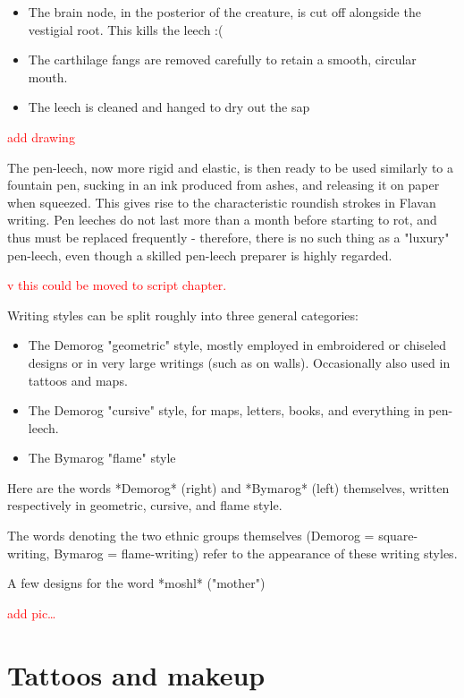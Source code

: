 \documentclass[10pt,oneside]{memoir}
\newcommand{\cmmnt}[1]{\textcolor{red}{#1}}
\begin{document}
\begin{itemize}
\item The brain node, in the posterior of the creature, is cut off alongside the vestigial root. This kills the leech :(
\item The carthilage fangs are removed carefully to retain a smooth, circular mouth.
\item The leech is cleaned and hanged to dry out the sap
\end{itemize}

\cmmnt{add drawing}

The pen-leech, now more rigid and elastic, is then ready to be used similarly to a fountain pen, sucking in an ink produced from ashes, and releasing it on paper when squeezed. This gives rise to the characteristic roundish strokes in Flavan writing. Pen leeches do not last more than a month before starting to rot, and thus must be replaced frequently - therefore, there is no such thing as a "luxury" pen-leech, even though a skilled pen-leech preparer is highly regarded.

\cmmnt{v this could be moved to script chapter.}

Writing styles can be split roughly into three general categories:

\begin{itemize}
\item The Demorog "geometric" style, mostly employed in embroidered or chiseled designs or in very large writings (such as on walls). Occasionally also used in tattoos and maps.
\item The Demorog "cursive" style, for maps, letters, books, and everything in pen-leech.
\item The Bymarog "flame" style
\end{itemize}

Here are the words *Demorog* (right) and *Bymarog* (left) themselves, written respectively in geometric, cursive, and flame style.

The words denoting the two ethnic groups themselves (Demorog = square-writing, Bymarog = flame-writing) refer to the appearance of these writing styles.

A few designs for the word *moshl* ("mother")

\cmmnt{add pic\ldots}

\pagebreak

\section{Tattoos and makeup}
\end{document}
